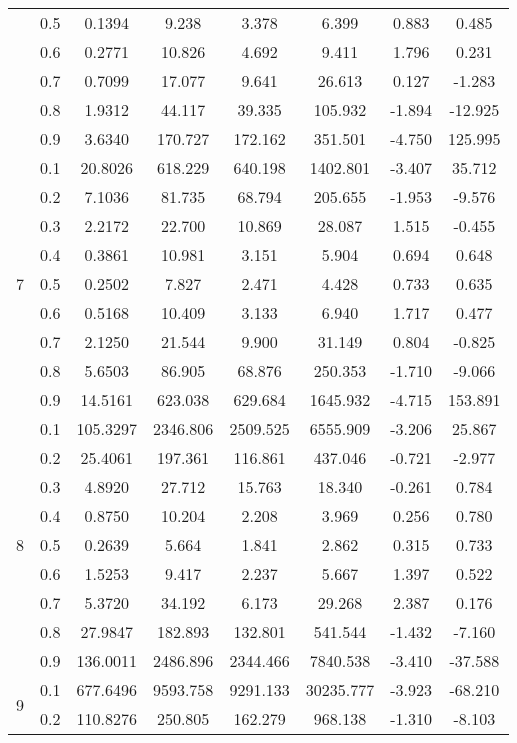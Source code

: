 \documentclass[11pt,a4paper]{report}
\begin{document}
\begin{longtable}{ | c | c || c | c | c | c | c | c | }
 & 0.5 & 0.1394 & 9.238 & 3.378 & 6.399 & 0.883 & 0.485 \\
 & 0.6 & 0.2771 & 10.826 & 4.692 & 9.411 & 1.796 & 0.231 \\
 & 0.7 & 0.7099 & 17.077 & 9.641 & 26.613 & 0.127 & -1.283 \\
 & 0.8 & 1.9312 & 44.117 & 39.335 & 105.932 & -1.894 & -12.925 \\
 & 0.9 & 3.6340 & 170.727 & 172.162 & 351.501 & -4.750 & 125.995 \\
 \hline
\multirow{9}{*}{7} & 0.1 & 20.8026 & 618.229 & 640.198 & 1402.801 & -3.407 & 35.712 \\
 & 0.2 & 7.1036 & 81.735 & 68.794 & 205.655 & -1.953 & -9.576 \\
 & 0.3 & 2.2172 & 22.700 & 10.869 & 28.087 & 1.515 & -0.455 \\
 & 0.4 & 0.3861 & 10.981 & 3.151 & 5.904 & 0.694 & 0.648 \\
 & 0.5 & 0.2502 & 7.827 & 2.471 & 4.428 & 0.733 & 0.635 \\
 & 0.6 & 0.5168 & 10.409 & 3.133 & 6.940 & 1.717 & 0.477 \\
 & 0.7 & 2.1250 & 21.544 & 9.900 & 31.149 & 0.804 & -0.825 \\
 & 0.8 & 5.6503 & 86.905 & 68.876 & 250.353 & -1.710 & -9.066 \\
 & 0.9 & 14.5161 & 623.038 & 629.684 & 1645.932 & -4.715 & 153.891 \\
 \hline
\multirow{9}{*}{8} & 0.1 & 105.3297 & 2346.806 & 2509.525 & 6555.909 & -3.206 & 25.867 \\
 & 0.2 & 25.4061 & 197.361 & 116.861 & 437.046 & -0.721 & -2.977 \\
 & 0.3 & 4.8920 & 27.712 & 15.763 & 18.340 & -0.261 & 0.784 \\
 & 0.4 & 0.8750 & 10.204 & 2.208 & 3.969 & 0.256 & 0.780 \\
 & 0.5 & 0.2639 & 5.664 & 1.841 & 2.862 & 0.315 & 0.733 \\
 & 0.6 & 1.5253 & 9.417 & 2.237 & 5.667 & 1.397 & 0.522 \\
 & 0.7 & 5.3720 & 34.192 & 6.173 & 29.268 & 2.387 & 0.176 \\
 & 0.8 & 27.9847 & 182.893 & 132.801 & 541.544 & -1.432 & -7.160 \\
 & 0.9 & 136.0011 & 2486.896 & 2344.466 & 7840.538 & -3.410 & -37.588 \\
 \hline
\multirow{9}{*}{9} & 0.1 & 677.6496 & 9593.758 & 9291.133 & 30235.777 & -3.923 & -68.210 \\
 & 0.2 & 110.8276 & 250.805 & 162.279 & 968.138 & -1.310 & -8.103 \\

\end{longtable}
\end{document}
